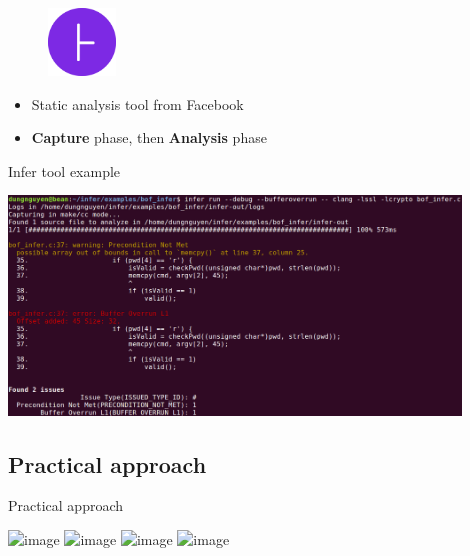\documentclass{beamer}
\begin{document}
\begin{frame}

\begin{figure}
\includegraphics[width = 1.8cm]{Figures/InferLogo.png}

\end{figure}

\vspace{1cm}

\begin{itemize}
\item Static analysis tool from Facebook
\item \textbf{Capture} phase, then \textbf{Analysis} phase
\end{itemize}

\end{frame}

\begin{frame}{Infer tool example}

\includegraphics[width=12cm]{Figures/main.c/inferRunOnMain.png}
\end{frame}

\subsection{Practical approach}



\begin{frame}{Practical approach}

\includegraphics<1>[scale=0.3]{Figures/Workflow/1.png}
\includegraphics<2>[scale=0.3]{Figures/Workflow/2.png}
\includegraphics<3>[scale=0.3]{Figures/Workflow/3.png}
\includegraphics<4>[scale=0.3]{Figures/Workflow/4.png}

\end{frame}
\end{document}
